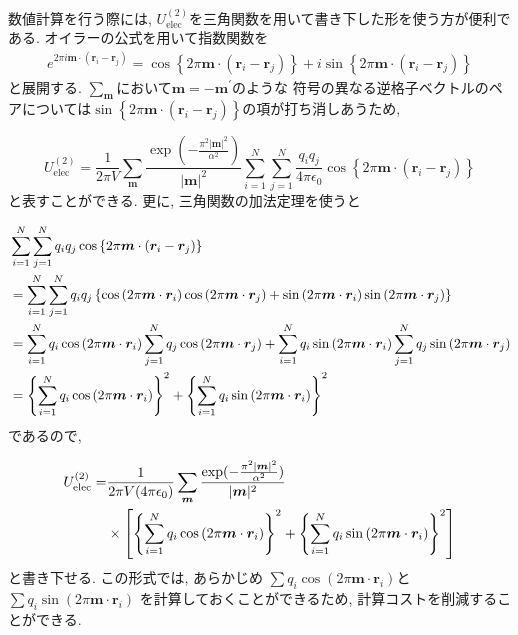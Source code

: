 数値計算を行う際には, $U_{\mathrm{elec}}^{(2)}$を三角関数を用いて書き下した形を使う方が便利である.
オイラーの公式を用いて指数関数を
\begin{align}
   e^{2 \pi i \bm{m} \cdot (\bm{r}_{i} - \bm{r}_{j})}
 =
     \cos\left\{ 2 \pi \bm{m} \cdot (\bm{r}_{i} - \bm{r}_{j}) \right\}
 + i \sin\left\{ 2 \pi \bm{m} \cdot (\bm{r}_{i} - \bm{r}_{j}) \right\}
\end{align}
と展開する. $\sum_{\bm{m}}$において$\bm{m} = -\bm{m^{\prime}}$のような
符号の異なる逆格子ベクトルのペアについては$\sin\left\{ 2 \pi \bm{m} \cdot (\bm{r}_{i} - \bm{r}_{j}) \right\}$の項が打ち消しあうため,

\begin{equation}
    U_{\mathrm{elec}}^{(2)}
  =
    \frac{1}{2 \pi V } \sum_{\bm{m}}
    \frac{\exp( -\frac{\pi^{2} |\bm{m}|^{2}}{\alpha^{2}})}{|\bm{m}|^{2}}
    \sum_{i=1}^{N} \sum_{j=1}^{N}
    \frac{q_{i}q_{j} }{4 \pi \epsilon_{0}}
    \cos\left\{ 2 \pi \bm{m} \cdot (\bm{r}_{i} - \bm{r}_{j}) \right\}
 \label{eq:Ewald32_1}
\end{equation}
と表すことができる. 更に, 三角関数の加法定理を使うと

\begin{align}
 &\sum_{i=1}^{N} \sum_{j=1}^{N}
   q_{i} q_{j}
   \cos\left\{ 2 \pi \bm{m} \cdot (\bm{r}_{i} - \bm{r}_{j}) \right\}
 \notag
 \\
 &=
   \sum_{i=1}^{N} \sum_{j=1}^{N}
   q_{i} q_{j}
   \left\{
           \cos\left(2 \pi \bm{m} \cdot \bm{r}_{i}\right)
           \cos\left(2 \pi \bm{m} \cdot \bm{r}_{j}\right)
         +
           \sin\left(2 \pi \bm{m} \cdot \bm{r}_{i}\right)
           \sin\left(2 \pi \bm{m} \cdot \bm{r}_{j}\right)
 \right\}
 \notag
 \\
 &=
          \sum_{i=1}^{N} q_{i} \cos\left(2 \pi \bm{m} \cdot \bm{r}_{i}\right)
          \sum_{j=1}^{N} q_{j} \cos\left(2 \pi \bm{m} \cdot \bm{r}_{j}\right)
        +
          \sum_{i=1}^{N} q_{i} \sin\left(2 \pi \bm{m} \cdot \bm{r}_{i}\right)
          \sum_{j=1}^{N} q_{j} \sin\left(2 \pi \bm{m} \cdot \bm{r}_{j}\right)
 \notag
 \\
 &=
  \left\{
          \sum_{i=1}^{N} q_{i} \cos\left(2 \pi \bm{m} \cdot \bm{r}_{i}\right)
  \right\}^{2}
 +
  \left\{
          \sum_{i=1}^{N} q_{i} \sin\left(2 \pi \bm{m} \cdot \bm{r}_{i}\right)
  \right\}^{2}
\end{align}
であるので,

\begin{align}
     U_{\mathrm{elec}}^{(2)}
  =&
    \frac{1}{2 \pi V (4 \pi \epsilon_{0})}
    \sum_{\bm{m}}
    \frac{\exp( -\frac{\pi^{2} |\bm{m}|^{2}}{\alpha^{2}})}{|\bm{m}|^{2}}
 \notag
 \\
 &\times
    \left[
    \left\{
           \sum_{i=1}^{N} q_{i} \cos\left(2 \pi \bm{m} \cdot \bm{r}_{i}\right)
    \right\}^{2}
  +
    \left\{
           \sum_{i=1}^{N} q_{i} \sin\left(2 \pi \bm{m} \cdot \bm{r}_{i}\right)
    \right\}^{2}
    \right]
 \label{eq:Ewald32_2}
\end{align}
と書き下せる. この形式では, あらかじめ
$\sum q_{i} \cos(2\pi\bm{m}\cdot\bm{r}_{i})$と
$\sum q_{i} \sin(2\pi\bm{m}\cdot\bm{r}_{i})$
を計算しておくことができるため, 計算コストを削減することができる.

